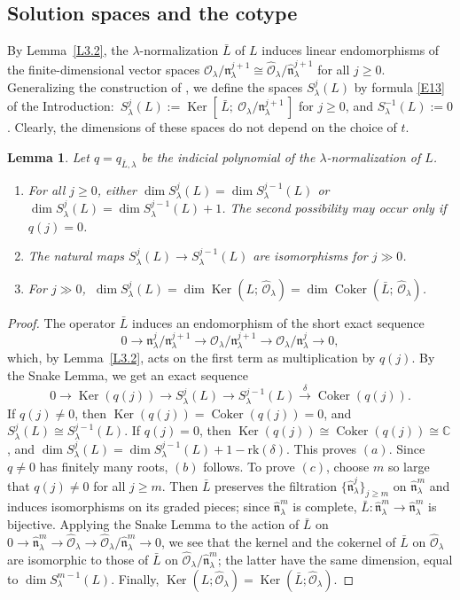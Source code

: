 \documentclass[11pt,reqno]{amsart}
\theoremstyle{plain}
\newtheorem{lemma}{Lemma}[section]
\theoremstyle{definition}
\theoremstyle{remark}
\numberwithin{equation}{section}
\newcommand{\cO}{\mathcal{O}}
\newcommand{\C}{\mathbb{C}}
\newcommand{\fn}{\mathfrak{n}}
\newcommand{\nl}{\mathfrak{n}_\lambda}
\newcommand{\hO}{\widehat{\cO}}
\newcommand{\hn}{\widehat{\fn}}
\DeclareMathOperator{\Ker}{Ker}
\DeclareMathOperator{\Coker}{Coker}
\begin{document}
\subsection{Solution spaces and the cotype}
\label{S3.3}
By Lemma~\ref{L3.2}, the $\lambda$-normalization $\bar L$ of $L$ induces linear endomorphisms of
the finite-dimensional vector spaces $\cO_\lambda/\nl^{j+1} \cong \hO_\lambda/\hn_\lambda^{j+1}$
for all $j \ge 0$. Generalizing the construction of \cite[Section~4]{Tsai}, we define the
spaces $S^j_\lambda(L)$ by formula \eqref{E13} of the Introduction:
$\,S^j_\lambda(L) := \Ker[\,\bar L;\ \cO_\lambda/\nl^{j+1}\,]$ for $j \ge 0$, and
$S^{-1}_\lambda(L) := 0$. Clearly, the dimensions of these spaces do not depend on the choice of
$t$.

\begin{lemma}
\label{L3.3}
Let $q = q_{\bar L, \lambda}$ be the indicial polynomial of the $\lambda$-normalization of $L$.
\begin{enumerate}
\item[$(a)$] For all $j \ge 0$, either $\dim S^j_\lambda(L) = \dim S^{j-1}_\lambda(L)$ or
$\dim S^j_\lambda(L) = \dim S^{j-1}_\lambda(L) + 1$. The second possibility may occur only if
$q(j) = 0$.
\item[$(b)$] The natural maps $S^j_\lambda(L) \to S^{j-1}_\lambda(L)$ are isomorphisms for
$j \gg 0$.
\item[$(c)$] For $j \gg 0$, $\ \dim S^j_\lambda(L) = \dim \Ker(L;\, \hO_\lambda) = \dim \Coker(\bar L;
\, \hO_\lambda)$.
\end{enumerate}
\end{lemma}

\begin{proof}
The operator $\bar L$ induces an endomorphism of the short exact sequence
\[
  0 \to \nl^j/\nl^{j+1} \to \cO_\lambda/\nl^{j+1} \to \cO_\lambda/\nl^{j} \to 0 ,
\]
which, by Lemma~\ref{L3.2}, acts on the first term as multiplication by $q(j)$. By the Snake
Lemma, we get an exact sequence
\[
  0 \to \Ker(q(j)) \to S^j_\lambda(L) \to S^{j-1}_\lambda(L) \xrightarrow{\ \delta\ } \Coker(q(j)) .
\]
If $q(j) \ne 0$, then $\Ker(q(j)) = \Coker(q(j)) = 0$, and $S^j_\lambda(L) \cong
S^{j-1}_\lambda(L)$. If $q(j) = 0$, then $\Ker(q(j)) \cong \Coker(q(j)) \cong \C$, and
$\dim S^j_\lambda(L) = \dim S^{j-1}_\lambda(L) + 1 - \mathrm{rk}(\delta)$. This proves $(a)$. Since
$q \ne 0$ has finitely many roots, $(b)$ follows. To prove $(c)$, choose $m$ so large that
$q(j) \ne 0$ for all $j \ge m$. Then $\bar L$ preserves the filtration
$\{\hn^j_\lambda\}_{j \ge m}$ on $\hn^m_\lambda$ and induces isomorphisms on its graded pieces;
since $\hn^m_\lambda$ is complete, $\bar L: \hn_\lambda^m \to \hn_\lambda^m$ is bijective.
Applying the Snake Lemma to the action of $\bar L$ on $0 \to \hn^m_\lambda \to \hO_\lambda \to
\hO_\lambda/\hn^m_\lambda \to 0$, we see that the kernel and the cokernel of $\bar L$ on
$\hO_\lambda$ are isomorphic to those of $\bar L$ on $\hO_\lambda/\hn^m_\lambda$; the latter have
the same dimension, equal to $\dim S^{m-1}_\lambda(L)$. Finally, $\Ker(L; \hO_\lambda) =
\Ker(\bar L; \hO_\lambda)$.
\end{proof}
\end{document}
